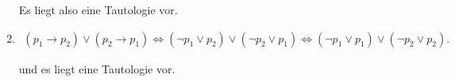 \begin{solution}
\begin{enumerate}[label = \alph*.]
  Es liegt also eine Tautologie vor.

  \item

  \begin{align*}
    (p_1 \to p_2) \lor (p_2 \to p_1) \iff (\neg p_1 \lor p_2) \lor (\neg p_2 \lor p_1) \iff (\neg p_1 \lor p_1) \lor (\neg p_2 \lor p_2).
  \end{align*}

  und es liegt eine Tautologie vor.

\end{enumerate}

\end{solution}


